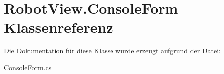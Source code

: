\hypertarget{class_robot_view_1_1_console_form}{
\section{RobotView.ConsoleForm Klassenreferenz}
\label{class_robot_view_1_1_console_form}
}


Die Dokumentation für diese Klasse wurde erzeugt aufgrund der Datei:\begin{DoxyCompactItemize}
\item 
ConsoleForm.cs\end{DoxyCompactItemize}

